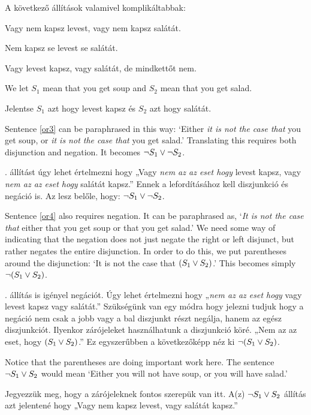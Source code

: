 A következő állítások valamivel komplikáltabbak:

\begin{earg}
\item[\ex{or3}] Vagy nem kapsz levest, vagy nem kapsz salátát.
\item[\ex{or4}] Nem kapsz se levest se salátát.
\item[\ex{or.xor}] Vagy levest kapsz, vagy salátát, de mindkettőt nem.
\end{earg}

We let $S_1$ mean that you get soup and $S_2$ mean that you get salad.

Jelentse $S_1$ azt hogy levest kapsz és $S_2$ azt hogy salátát.

Sentence \ref{or3} can be paraphrased in this way: `Either \emph{it is not the case that} you get soup, or \emph{it is not the case that} you get salad.' Translating this requires both disjunction and negation. It becomes $\neg S_1 \vee \neg S_2$.

. állítást úgy lehet értelmezni hogy „Vagy \emph{nem az az eset hogy} levest kapsz, vagy \emph{nem az az eset hogy} salátát kapsz.” Ennek a lefordításához kell diszjunkció és negáció is. Az lesz belőle, hogy: $\neg S_1 \vee \neg S_2$.

Sentence \ref{or4} also requires negation. It can be paraphrased as, `\emph{It is not the case that} either that you get soup or that you get salad.' We need some way of indicating that the negation does not just negate the right or left disjunct, but rather negates the entire disjunction. In order to do this, we put parentheses around the disjunction: `It is not the case that $(S_1 \vee S_2)$.' This becomes simply $\neg (S_1 \vee S_2)$.

. állítás is igényel negációt. Úgy lehet értelmezni hogy „\emph{nem az az eset hogy} vagy levest kapsz vagy salátát.” Szükségünk van egy módra hogy jelezni tudjuk hogy a negáció nem csak a jobb vagy a bal diszjunkt részt negálja, hanem az egész diszjunkciót. Ilyenkor zárójeleket használhatunk a diszjunkció köré. „Nem az az eset, hogy $(S_1 \vee S_2)$.” Ez egyszerűbben a következőképp néz ki $\neg (S_1 \vee S_2)$.

Notice that the parentheses are doing important work here. The sentence $\neg S_1 \vee S_2$ would mean `Either you will not have soup, or you will have salad.'

Jegyezzük meg, hogy a zárójeleknek fontos szerepük van itt. A(z) $\neg S_1 \vee S_2$ állítás azt jelentené hogy „Vagy nem kapsz levest, vagy salátát kapsz.”

